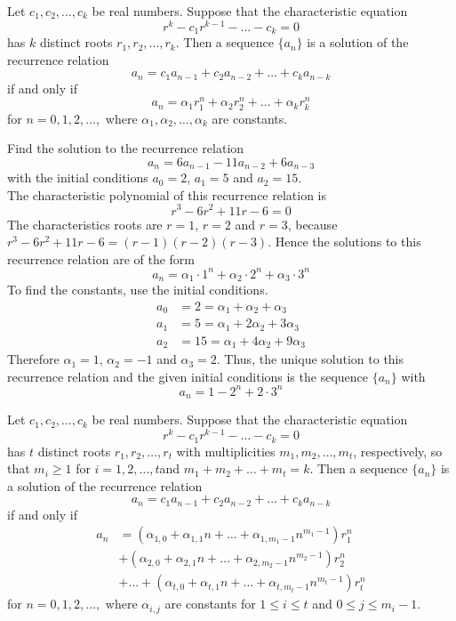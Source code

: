 \documentclass[12pt]{article}
\begin{document}
\begin{theorem} Let $c_1, c_2, \dots, c_k$ be real numbers. Suppose that the characteristic equation $$r^k - c_1r^{k - 1} - \dots - c_k = 0$$ has $k$ distinct roots $r_1, r_2, \dots, r_k$. Then a sequence $\{a_n\}$ is a solution of the recurrence relation $$a_n = c_1a_{n - 1} + c_2a_{n - 2} + \dots + c_ka_{n - k} $$ if and only if $$a_n = \alpha_1r_1^n + \alpha_2r_2^n + \dots + \alpha_kr_k^n $$ for $n = 0, 1, 2, \dots,$ where $\alpha_1, \alpha_2, \dots, \alpha_k$ are constants. \end{theorem} 

\begin{example} Find the solution to the recurrence relation $$a_n = 6a_{n - 1} - 11a_{n - 2} + 6a_{n - 3} $$ with the initial conditions $a_0 = 2$, $a_1 = 5$ and $a_2 = 15$. \\ 
The characteristic polynomial of this recurrence relation is $$r^3 - 6r^2 + 11r - 6 = 0 $$ The characteristics roots are $r = 1$, $r = 2$ and $r = 3$, because $r^3 - 6r^2 + 11r - 6 = (r - 1)(r - 2)(r - 3)$. Hence the solutions to this recurrence relation are of the form $$a_n = \alpha_1\cdot 1^n + \alpha_2 \cdot 2^n + \alpha_3 \cdot 3^n $$ To find the constants, use the initial conditions. 
$$\begin{aligned} a_0 &= 2 = \alpha_1 + \alpha_2 + \alpha_3 \\ a_1 &= 5 = \alpha_1 + 2\alpha_2 + 3\alpha_3 \\ a_2 &= 15 = \alpha_1 + 4\alpha_2 + 9\alpha_3 \end{aligned} $$ Therefore $\alpha_1 = 1$, $\alpha_2 = -1$ and $\alpha_3 = 2$. Thus, the unique solution to this recurrence relation and the given initial conditions is the sequence $\{a_n\}$ with $$a_n = 1 - 2^n + 2\cdot 3^n $$ \end{example} 

\begin{theorem} Let $c_1, c_2, \dots, c_k$ be real numbers. Suppose that the characteristic equation $$r^k - c_1r^{k - 1} - \dots - c_k = 0$$ has $t$ distinct roots $r_1, r_2, \dots, r_t$ with multiplicities $m_1, m_2, \dots, m_t$, respectively, so that $m_i \geq 1$ for $i = 1, 2, \dots, t$and $m_1 + m_2 + \dots + m_t = k$. Then a sequence $\{a_n\}$ is a solution of the recurrence relation $$a_n = c_1a_{n - 1} + c_2a_{n - 2} + \dots + c_ka_{n - k} $$ if and only if $$ \begin{aligned} 
a_n &= (\alpha_{1, 0} + \alpha_{1, 1}n + \dots + \alpha_{1, m_1 - 1}n^{m_1 - 1})r_1^n \\ &+ (\alpha_{2, 0} + \alpha_{2, 1}n + \dots + \alpha_{2, m_2 - 1}n^{m_2 - 1})r_2^n \\ &+ \dots + (\alpha_{t, 0} + \alpha_{t, 1}n + \dots + \alpha_{t, m_t - 1}n^{m_t - 1})r_t^n \end{aligned} $$ for $n = 0, 1, 2, \dots,$ where $\alpha_{i, j}$ are constants for $1 \leq i \leq t$ and $0 \leq j \leq m_i - 1$. \end{theorem} 
\end{document}
